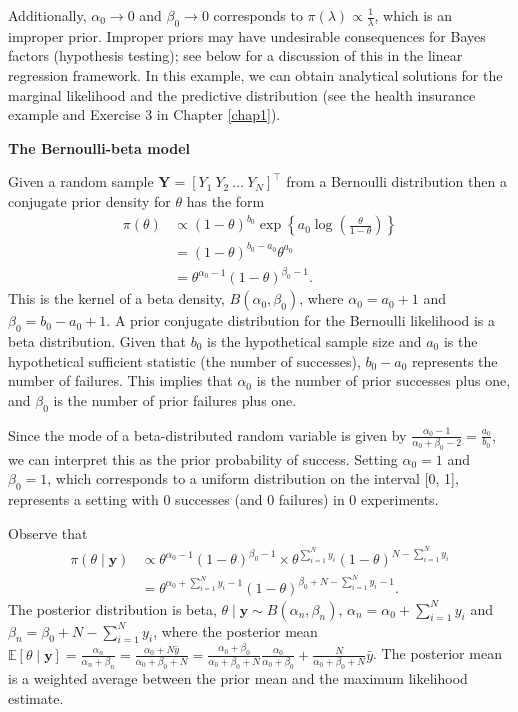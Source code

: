 \begin{enumerate}
Additionally, \( \alpha_0 \to 0 \) and \( \beta_0 \to 0 \) corresponds to \( \pi(\lambda) \propto \frac{1}{\lambda} \), which is an improper prior. Improper priors may have undesirable consequences for Bayes factors (hypothesis testing); see below for a discussion of this in the linear regression framework. In this example, we can obtain analytical solutions for the marginal likelihood and the predictive distribution (see the health insurance example and Exercise 3 in Chapter \ref{chap1}).

\textbf{The Bernoulli-beta model}

Given a random sample $\bm{Y}=[Y_1 \ Y_2 \ \dots \ Y_N]^{\top}$ from a Bernoulli distribution then a conjugate prior density for $\theta$ has the form 
\begin{align}
	\pi(\theta)&\propto (1-\theta)^{b_0} \exp\left\{a_0\log\left(\frac{\theta}{1-\theta}\right)\right\}\nonumber\\
	& = (1-\theta)^{b_0-a_0}\theta^{a_0}\nonumber\\
	& = \theta^{\alpha_0-1}(1-\theta)^{\beta_0-1}.\nonumber
\end{align}
This is the kernel of a beta density, \( B(\alpha_0, \beta_0) \), where \( \alpha_0 = a_0 + 1 \) and \( \beta_0 = b_0 - a_0 + 1 \). A prior conjugate distribution for the Bernoulli likelihood is a beta distribution. Given that \( b_0 \) is the hypothetical sample size and \( a_0 \) is the hypothetical sufficient statistic (the number of successes), \( b_0 - a_0 \) represents the number of failures. This implies that \( \alpha_0 \) is the number of prior successes plus one, and \( \beta_0 \) is the number of prior failures plus one.

Since the mode of a beta-distributed random variable is given by \( \frac{\alpha_0 - 1}{\alpha_0 + \beta_0 - 2} = \frac{a_0}{b_0} \), we can interpret this as the prior probability of success. Setting \( \alpha_0 = 1 \) and \( \beta_0 = 1 \), which corresponds to a uniform distribution on the interval [0, 1], represents a setting with 0 successes (and 0 failures) in 0 experiments. 

Observe that
\begin{align}
	\pi(\theta\mid \bm{y})&\propto \theta^{\alpha_0-1}(1-\theta)^{\beta_0-1} \times \theta^{\sum_{i=1}^N y_i}(1-\theta)^{N-\sum_{i=1}^Ny_i}\nonumber\\
	&= \theta^{\alpha_0+\sum_{i=1}^N y_i-1}(1-\theta)^{\beta_0+N-\sum_{i=1}^Ny_i-1}.\nonumber 
\end{align}
The posterior distribution is beta, $\theta\mid \bm{y}\sim B(\alpha_n,\beta_n)$, $\alpha_n=\alpha_0+\sum_{i=1}^N y_i$ and $\beta_n=\beta_0+N-\sum_{i=1}^Ny_i$, where the posterior mean $\mathbb{E}[\theta\mid \bm{y}]=\frac{\alpha_n}{\alpha_n+\beta_n}=\frac{\alpha_0+N\bar{y}}{\alpha_0+\beta_0+N}=\frac{\alpha_0+\beta_0}{\alpha_0+\beta_0+N}\frac{\alpha_0}{\alpha_0+\beta_0}+\frac{N}{\alpha_0+\beta_0+N}\bar{y}$. The posterior mean is a weighted average between the prior mean and the maximum likelihood estimate.


\end{enumerate}
